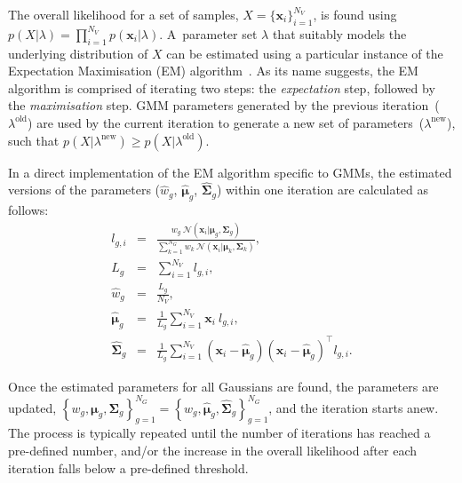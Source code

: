 \documentclass[10pt,a4paper]{article}
\def\Vec#1{{\boldsymbol{#1}}}
\def\Mat#1{{\boldsymbol{#1}}}
\begin{document}
The overall likelihood for a set of samples, $X=\{\Vec{x}_i\}_{i=1}^{N_V}$,
is found using $p(X | \lambda) = \prod\nolimits_{i=1}^{N_V} p(\Vec{x}_i | \lambda)$.
A~parameter set $\lambda$ that suitably models the underlying distribution of $X$ can be estimated using a particular instance of the Expectation Maximisation (EM) algorithm~\cite{Dempster77, McLachlan-2008, Moon96, Redner84}.
As its name suggests, the EM algorithm is comprised of iterating two steps: the {\it expectation} step, followed by the {\it maximisation} step.
GMM parameters generated by the previous iteration~($\lambda^{\textrm{old}}$) are used
by the current iteration to generate a new set of parameters~($\lambda^{\textrm{new}}$),
such that $p(X|\lambda^{\textrm{new}}) \geq p(X|\lambda^{\textrm{old}})$.

In a direct implementation of the EM algorithm specific to GMMs,
the estimated versions of the parameters ($\widehat{w}_g$, $\widehat{\Vec{\mu}}_g$, $\widehat{\Mat{\Sigma}}_g$)
within one iteration are calculated as follows:
%
\begin{eqnarray}
  l_{g,i}                  & = & \frac{w_g ~ {{\mathcal{N}}}( \Vec{x}_i | \Vec{\mu}_g, \Mat{\Sigma}_g )}{\sum\nolimits_{k=1}^{N_G} w_k ~ {{\mathcal{N}}}( \Vec{x}_i | \Vec{\mu}_k, \Mat{\Sigma}_k )}, \label{eqn:aposteriori} \\
  L_g                      & = & \sum\nolimits_{i=1}^{N_V} l_{g,i}, \label{eqn:em_sum_lhood} \\
  \widehat{w}_g            & = & \frac{L_g}{N_V},  \label{eqn:em_weight} \\
  \widehat{\Vec{\mu}}_g    & = & \frac{1}{L_g} \sum\nolimits_{i=1}^{N_V} \Vec{x}_i ~ l_{g,i}  \label{eqn:em_mean}, \\
  \widehat{\Mat{\Sigma}}_g & = & \frac{1}{L_g} \sum\nolimits_{i=1}^{N_V} (\Vec{x}_i - \widehat{\Vec{\mu}}_g)(\Vec{x}_i - \widehat{\Vec{\mu}}_g)^\top l_{g,i}. \label{eqn:em_cov}
\end{eqnarray}

Once the estimated parameters for all Gaussians are found, the parameters are updated,
{\small $\left\{ w_g, \Vec{\mu}_g, \Mat{\Sigma}_g \right\}_{g=1}^{N_G} = \left\{ \widehat{w}_g, \widehat{\Vec{\mu}}_g, \widehat{\Mat{\Sigma}}_g \right\}_{g=1}^{N_G}$},
and the iteration starts anew.
The process is typically repeated until the number of iterations has reached a pre-defined number,
and/or the increase in the overall likelihood after each iteration falls below a pre-defined threshold.
\end{document}
